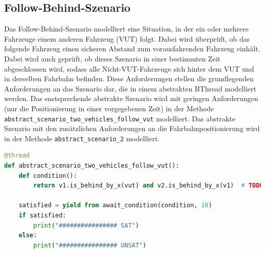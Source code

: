 \subsection{Follow-Behind-Szenario}
Das Follow-Behind-Szenario modelliert eine Situation, in der ein oder mehrere Fahrzeuge einem anderen Fahrzeug (VUT) folgt. Dabei wird überprüft, ob das folgende Fahrzeug einen sicheren Abstand zum vorausfahrenden Fahrzeug einhält.
Dabei wird auch geprüft, ob dieses Szenario in einer bestimmten Zeit abgeschlossen wird, sodass alle Nicht-VUT-Fahrzeuge sich hinter dem VUT und in derselben Fahrbahn befinden.
Diese Anforderungen stellen die grundlegenden Anforderungen an das Szenario dar, die in einem abstrakten BThread modelliert werden. Das enstsprechende abstrakte Szenario wird mit geringen Anforderungen (nur die Positionierung in einer vorgegebenen Zeit) in der Methode \texttt{abstract\_scenario\_two\_vehicles\_follow\_vut} modelliert.
Das abstrakte Szenario mit den zusätzlichen Anforderungen an die Fahrbahnpositionierung wird in der Methode \texttt{abstract\_scenario\_2} modelliert.
\begin{lstlisting}[language=Python, caption=bstraktes Szenario: Zwei Fahrzeuge folgen dem VUT]
@thread
def abstract_scenario_two_vehicles_follow_vut():
    def condition():
        return v1.is_behind_by_x(vut) and v2.is_behind_by_x(v1)  # TODO: Same lane?

    satisfied = yield from await_condition(condition, 10)
    if satisfied:
        print("################ SAT")
    else:
        print("################ UNSAT")
\end{lstlisting}

